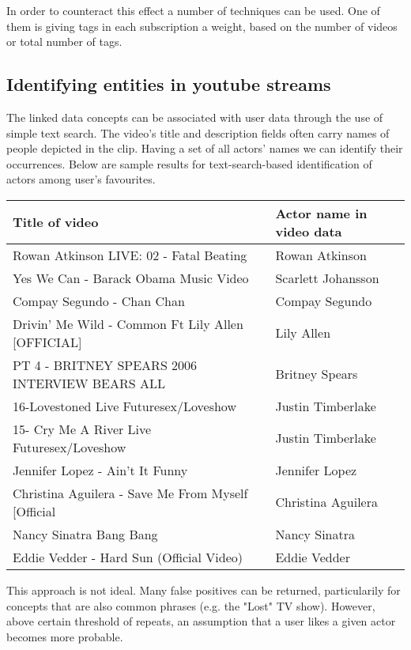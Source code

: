 In order to counteract this effect a number of techniques can be used. One of
them is giving tags in each subscription a weight, based on the number of videos or
total number of tags.

\subsection{Identifying entities in youtube streams}
The linked data concepts can be associated with user data through the use of
simple text search. The video's title and description fields often carry names
of people depicted in the clip. Having a set of all actors' names we can
identify their occurrences. Below are sample results for text-search-based
identification of actors among user's favourites.

\begin{center}
  \begin{tabular}{ | p{7cm} | p{4cm} | } \hline
    Title of video & Actor name in video data \\ \hline
    Rowan Atkinson LIVE: 02 - Fatal Beating & Rowan Atkinson \\ \hline
    Yes We Can - Barack Obama Music Video & Scarlett Johansson \\ \hline
    Compay Segundo - Chan Chan & Compay Segundo \\ \hline
    Drivin' Me Wild - Common Ft Lily Allen [OFFICIAL] & Lily Allen \\ \hline
    PT 4 - BRITNEY SPEARS 2006 INTERVIEW BEARS ALL & Britney Spears \\ \hline
    16-Lovestoned Live Futuresex/Loveshow & Justin Timberlake \\ \hline
    15- Cry Me A River Live Futuresex/Loveshow & Justin Timberlake \\ \hline
    Jennifer Lopez - Ain't It Funny & Jennifer Lopez \\ \hline
    Christina Aguilera - Save Me From Myself [Official & Christina Aguilera \\ \hline
    Nancy Sinatra Bang Bang & Nancy Sinatra \\ \hline
    Eddie Vedder - Hard Sun (Official Video) & Eddie Vedder \\ \hline
  \end{tabular}
\end{center}

This approach is not ideal. Many false positives can be returned, particularily
for concepts that are also common phrases (e.g. the "Lost" TV show). However,
above certain threshold of repeats, an
assumption that a user likes a given actor becomes more probable.

